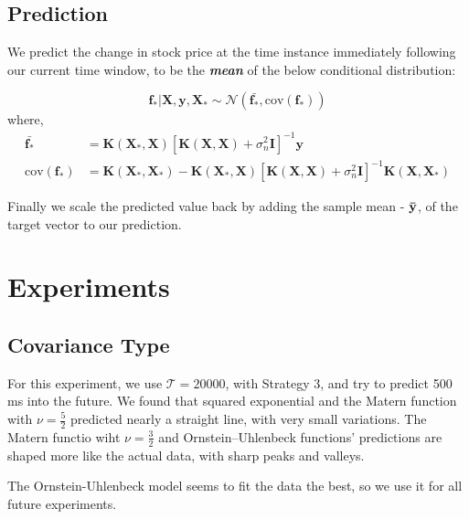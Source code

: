 \documentclass{article} %
\begin{document}
\subsection{Prediction}

We predict the change in stock price at the time instance immediately following our current time window, to be the \textbf{\textit{mean}} of the below conditional distribution:

\begin{equation}
 \boldsymbol{f_*} | \boldsymbol{X}, \boldsymbol{y}, \boldsymbol{X_*} \sim \mathcal{N}\left(\bar{\boldsymbol{f_*}}, \mbox{cov}(\boldsymbol{f_*})\right)
\end{equation}
where,
\begin{align}
\bar{\boldsymbol{f_*}} &= \boldsymbol{K}\left(\boldsymbol{X_*}, \boldsymbol{X}\right) \left[ \boldsymbol{K}\left(\boldsymbol{X}, \boldsymbol{X}\right) + \sigma_n^2\boldsymbol{I}\right]^{-1} \boldsymbol{y} \\
\mbox{cov}(\boldsymbol{f_*}) &= \boldsymbol{K}\left(\boldsymbol{X_*}, \boldsymbol{X_*}\right) - \boldsymbol{K}\left(\boldsymbol{X_*}, \boldsymbol{X}\right) \left[ \boldsymbol{K}\left(\boldsymbol{X}, \boldsymbol{X}\right) + \sigma_n^2\boldsymbol{I}\right]^{-1} \boldsymbol{K}\left(\boldsymbol{X}, \boldsymbol{X_*}\right)
\end{align}

Finally we scale the predicted value back by adding the sample mean - $\bf\bar{y}$, of the target vector to our prediction.

\section{Experiments}

\subsection{Covariance Type}
For this experiment, we use $\mathcal{T} = 20000$, with Strategy 3, and try to predict 500 ms into the future.
We found that squared exponential and the Matern function with $\nu = \frac{5}{2}$ predicted nearly a straight line, with very small variations.
The Matern functio wiht $\nu = \frac{3}{2}$ and Ornstein–Uhlenbeck functions' predictions are shaped more like the actual data, with sharp peaks and valleys.

The Ornstein-Uhlenbeck model seems to fit the data the best, so we use it for all future experiments.
\end{document}
